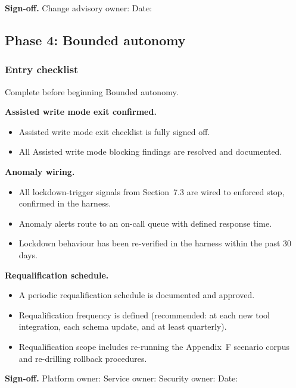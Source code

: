 \documentclass[11pt]{article}
\begin{document}
\textbf{Sign-off.} Change advisory owner: \underline{\hspace{1.5in}} \quad Date: \underline{\hspace{1in}}

\subsection{Phase 4: Bounded autonomy}

\subsubsection{Entry checklist}
Complete before beginning Bounded autonomy.

\textbf{Assisted write mode exit confirmed.}
\begin{itemize}
  \item Assisted write mode exit checklist is fully signed off.
  \item All Assisted write mode blocking findings are resolved and documented.
\end{itemize}

\textbf{Anomaly wiring.}
\begin{itemize}
  \item All lockdown-trigger signals from Section~7.3 are wired to enforced stop, confirmed in the harness.
  \item Anomaly alerts route to an on-call queue with defined response time.
  \item Lockdown behaviour has been re-verified in the harness within the past 30 days.
\end{itemize}

\textbf{Requalification schedule.}
\begin{itemize}
  \item A periodic requalification schedule is documented and approved.
  \item Requalification frequency is defined (recommended: at each new tool integration, each schema update, and at least quarterly).
  \item Requalification scope includes re-running the Appendix~F scenario corpus and re-drilling rollback procedures.
\end{itemize}

\textbf{Sign-off.} Platform owner: \underline{\hspace{1in}} \quad Service owner: \underline{\hspace{1in}} \quad Security owner: \underline{\hspace{1in}} \quad Date: \underline{\hspace{0.7in}}
\end{document}
